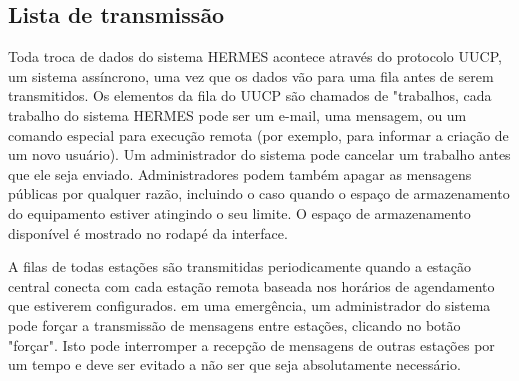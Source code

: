 \documentclass[11pt,a4paper]{article}
\begin{document}
\subsection{Lista de transmissão}
\label{gui_trans_list}

Toda troca de dados do sistema HERMES acontece através do protocolo UUCP, um sistema assíncrono, uma vez que os dados vão para uma fila antes de serem transmitidos. Os elementos da fila do UUCP são chamados de "trabalhos, cada trabalho do sistema HERMES pode ser um e-mail, uma mensagem, ou um comando especial para execução remota (por exemplo, para informar a criação de um novo usuário). Um administrador do sistema pode cancelar um trabalho antes que ele seja enviado. Administradores podem também apagar as mensagens públicas por qualquer razão, incluindo o caso quando o espaço de armazenamento do equipamento estiver atingindo o seu limite. O espaço de armazenamento disponível é mostrado no rodapé da interface. 


A filas de todas estações são transmitidas periodicamente quando a estação central conecta com cada estação remota baseada nos horários de agendamento que estiverem configurados. em uma emergência, um administrador do sistema pode forçar a transmissão de mensagens entre estações, clicando no botão "forçar". Isto pode interromper a recepção de mensagens de outras estações por um tempo e deve ser evitado a não ser que seja absolutamente necessário.
\end{document}
